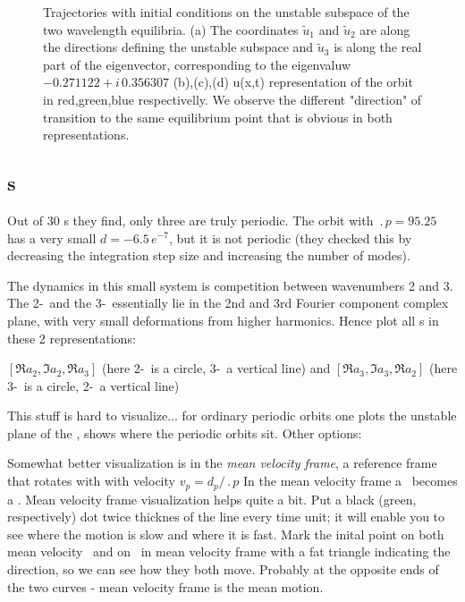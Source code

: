 \begin{figure}[t]
\caption{
 Trajectories with initial conditions on the unstable subspace of
 the two wavelength equilibria.  
 (a) The coordinates $\tilde{u}_1$ and $\tilde{u}_2$ are along the directions defining the unstable subspace
 and $\tilde{u}_3$  is along the real part of the eigenvector, 
 corresponding to the eigenvaluw $-0.271122+ i\, 0.356307$
 (b),(c),(d) u(x,t) representation of the orbit in red,green,blue respectivelly.  We observe
the different "direction" of transition to the same equilibrium point that is obvious in both
representations.}
\label{f:neighborhood2w}
\end{figure}

\subsection{\Rpo s}

%
Out of 30 \rpo s they
find,  only three are truly periodic.  The orbit
with $\period{p} = 95.25$ has a very small
$d = -6.5\,e^{-7}$, but it is not periodic 
(they
checked this by decreasing the integration step size and increasing the
number of modes).

The dynamics in this small system is competition between wavenumbers
2 and 3. The 2-\eqv\  and the 3-\eqv\  essentially lie in
the 2nd and 3rd Fourier component complex plane, with very
small deformations from higher harmonics.
Hence plot all \rpo s in these 2 representations:

$[ \Re a_2, \Im a_2, \Re a_3 ]$
(here 2-\eqv\  is a circle, 3-\eqv\ a vertical line)
 and
$[ \Re a_3, \Im a_3, \Re a_2 ]$
(here 3-\eqv\ is a circle, 2-\eqv\ a vertical line)

This stuff is hard to visualize... for ordinary periodic orbits one
plots the unstable plane of the \eqv, shows where the periodic
orbits sit. Other options:

Somewhat better visualization is in the
{\em mean velocity frame}, {\ie} 
a reference frame that rotates with with velocity 
$v_p=d_p/\period{p}$
In the mean velocity frame a \rpo\ becomes
a \po.
Mean velocity frame visualization helps quite a bit.
Put a black (green, respectively) dot
twice thicknes of the line every time unit; it will enable you to see
where the motion is slow and where it is fast.
Mark the inital point on both
mean velocity \rpo\ and on \eqv\  in mean velocity
 frame with a fat triangle
indicating the direction, so we can see how they both move. Probably at the
opposite ends of the two curves - mean velocity frame is the mean motion.

